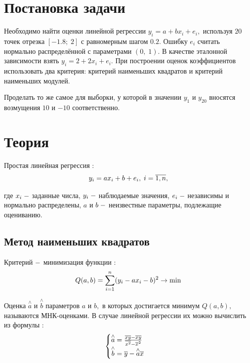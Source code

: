 \documentclass[a4]{article}
\renewcommand{\listoffigures}{\begingroup %
\tocsection
\tocfile{\listfigurename}{lof}
\endgroup}
\renewcommand{\listoftables}{\begingroup %
\tocsection
\tocfile{\listtablename}{lot}
\endgroup}
\begin{document}
\newpage
\pagestyle{plain}




\newpage
\tableofcontents{}
\newpage
\listoffigures{}
\listoftables{}
\newpage

\section{Постановка задачи}

Необходимо найти оценки линейной регрессии $y_i=a+bx_i+e_i,$ используя $20$ точек отрезка $[-1.8;\;2]$ с равномерным шагом $0.2.$ Ошибку $e_i$ считать нормально распределённой с параметрами $(0,\;1).$ В качестве эталонной зависимости взять $y_i=2+2x_i+e_i.$ При построении оценок коэффициентов использовать два критерия: критерий наименьших квадратов и критерий наименьших модулей.

Проделать то же самое для выборки, у которой в значении $y_1$ и $y_{20}$ вносятся возмущения $10$ и $-10$ соответственно.

\section{Теория}
Простая линейная регрессия \cite{lin_reg}:
\begin{equation}
    y_i=ax_i+b+e_i,\;i=\overline{1,n},\hfill
\end{equation}

где $x_i\;\--$ заданные числа, $y_i\;\--$ наблюдаемые значения, $e_i\;\--$ независимы и нормально распределены, $a$ и $b\;\--$ неизвестные параметры, подлежащие оцениванию.

\subsection{Метод наименьших квадратов}

Критерий $\--$ минимизация функции \cite{MNK}:
\begin{equation}
    Q(a,b)=\sum\limits_{i=1}^n(y_i-ax_i-b)^2\to \min\hfill
\end{equation}

Оценка $\overset{\wedge}{a}$ и $\overset{\wedge}{b}$ параметров $a$ и $b,$ в которых достигается минимум $Q(a,b),$ называются МНК-оценками. В случае линейной регрессии их можно вычислить из формулы \cite{6_3}:
\begin{equation}
    \begin{cases}
    \overset{\wedge}{a} = \frac{\overline{x y}-\overline{x}\overline{y}}{\overline{x^2}-\overline{x}^2}\\
    \overset{\wedge}{b} = \overline{y}-\overset{\wedge}{a}\overline{x}
    \end{cases}\hfill
\end{equation}
\end{document}

